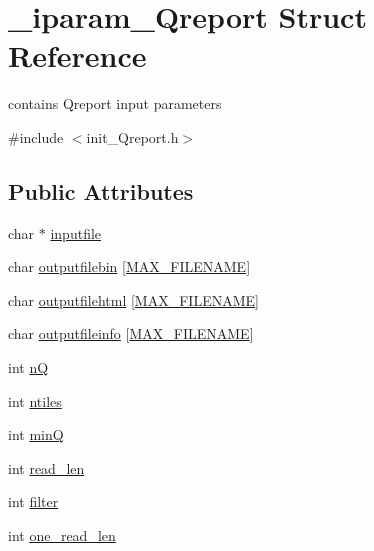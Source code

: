 \hypertarget{struct__iparam__Qreport}{\section{\+\_\+iparam\+\_\+\+Qreport Struct Reference}
\label{struct__iparam__Qreport}
}


contains Qreport input parameters  




{\ttfamily \#include $<$init\+\_\+\+Qreport.\+h$>$}

\subsection*{Public Attributes}
\begin{DoxyCompactItemize}
\item 
char $\ast$ \hyperlink{struct__iparam__Qreport_ac96f6463d81dc1fcc41850564f24cf11}{inputfile}
\item 
char \hyperlink{struct__iparam__Qreport_abdf92f14bc1c49787cda4b94ceb668cd}{outputfilebin} \mbox{[}\hyperlink{defines_8h_abe0ec333b60117063f9b9fd9f849cb08}{M\+A\+X\+\_\+\+F\+I\+L\+E\+N\+A\+M\+E}\mbox{]}
\item 
char \hyperlink{struct__iparam__Qreport_a54ffbb27584db445494af7d9a1c214de}{outputfilehtml} \mbox{[}\hyperlink{defines_8h_abe0ec333b60117063f9b9fd9f849cb08}{M\+A\+X\+\_\+\+F\+I\+L\+E\+N\+A\+M\+E}\mbox{]}
\item 
char \hyperlink{struct__iparam__Qreport_a75f5c38f9365c0c1370040928f43d316}{outputfileinfo} \mbox{[}\hyperlink{defines_8h_abe0ec333b60117063f9b9fd9f849cb08}{M\+A\+X\+\_\+\+F\+I\+L\+E\+N\+A\+M\+E}\mbox{]}
\item 
int \hyperlink{struct__iparam__Qreport_a47cfa018e6e957cb132e22876a400a1f}{n\+Q}
\item 
int \hyperlink{struct__iparam__Qreport_a9d91db490f318f69dcea4999f630712e}{ntiles}
\item 
int \hyperlink{struct__iparam__Qreport_a1fa54b38e988ffe30eba5e0284e9dacb}{min\+Q}
\item 
int \hyperlink{struct__iparam__Qreport_a1004bab2a5776669710b74925ba4d338}{read\+\_\+len}
\item 
int \hyperlink{struct__iparam__Qreport_ae1ce417a16c5d30c05a09ec868154e14}{filter}
\item 
int \hyperlink{struct__iparam__Qreport_a0a09c5cc791e625b948acb45b39164e6}{one\+\_\+read\+\_\+len}
\end{DoxyCompactItemize}


